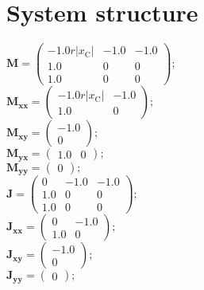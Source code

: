 \documentclass[11pt, oneside]{article}      %
\begin{document}
\section{System structure}
%

%
$ \mathbf{M} = \left(\begin{array}{ccc}- 1.0 r \left|{x_{\mathrm{C}}}\right| & -1.0 & -1.0\\1.0 & 0 & 0\\1.0 & 0 & 0\end{array}\right) ; $ 
%
\\
%
$ \mathbf{M_{xx}} = \left(\begin{array}{cc}- 1.0 r \left|{x_{\mathrm{C}}}\right| & -1.0\\1.0 & 0\end{array}\right) ; $ 
%
\\
%
$ \mathbf{M_{xy}} = \left(\begin{array}{c}-1.0\\0\end{array}\right) ; $ 
%
\\
%
$ \mathbf{M_{yx}} = \left(\begin{array}{cc}1.0 & 0\end{array}\right) ; $ 
%
\\
%
$ \mathbf{M_{yy}} = \left(\begin{array}{c}0\end{array}\right) ; $ 
%
\\
%

%
$ \mathbf{J} = \left(\begin{array}{ccc}0 & -1.0 & -1.0\\1.0 & 0 & 0\\1.0 & 0 & 0\end{array}\right) ; $ 
%
\\
%
$ \mathbf{J_{xx}} = \left(\begin{array}{cc}0 & -1.0\\1.0 & 0\end{array}\right) ; $ 
%
\\
%
$ \mathbf{J_{xy}} = \left(\begin{array}{c}-1.0\\0\end{array}\right) ; $ 
%
\\
%
$ \mathbf{J_{yy}} = \left(\begin{array}{c}0\end{array}\right) ; $ 
%
\\
%
\end{document}
